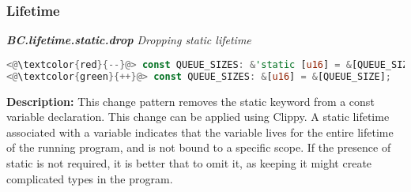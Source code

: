 \subsubsection{Lifetime}
\noindent\textit{\textbf{BC.lifetime.static.drop} Dropping static lifetime}

\begin{lstlisting}[language=Rust, style=colouredRust]
<@\textcolor{red}{--}@> const QUEUE_SIZES: &'static [u16] = &[QUEUE_SIZE];
<@\textcolor{green}{++}@> const QUEUE_SIZES: &[u16] = &[QUEUE_SIZE];

\end{lstlisting}

\noindent\textbf{Description:} This change pattern removes the static keyword from a const variable declaration. This change can be applied using Clippy. A static lifetime associated with a variable indicates that the variable lives for the entire lifetime of the running program, and is not bound to a specific scope. If the presence of static is not required, it is better that to omit it, as keeping it might create complicated types in the program.

